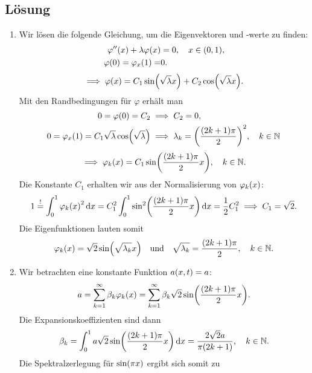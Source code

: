 \documentclass{exercise}
\begin{document}
    \subsection*{Lösung}
    \begin{enumerate}
        \item Wir lösen die folgende Gleichung, um die Eigenvektoren und -werte zu finden:
        \begin{align*}
            \varphi''\parentheses*{x} + \lambda\varphi\parentheses*{x} &= 0, \quad x \in \parentheses*{0, 1},\\
            \varphi\parentheses*{0} = \varphi_x\parentheses*{1} =& 0.
        \end{align*}
        \[
            \implies \varphi\parentheses*{x} = C_1 \sin\parentheses*{\sqrt{\lambda}x} + C_2 \cos\parentheses*{\sqrt{\lambda}x}.
        \]
        Mit den Randbedingungen für \(\varphi\) erhält man
        \begin{align*}
            0 = \varphi\parentheses*{0} = C_2 &\implies C_2 = 0,\\
            0 = \varphi_x\parentheses*{1} = C_1 \sqrt{\lambda}\cos\parentheses*{\sqrt{\lambda}} &\implies \lambda_k = \parentheses*{\frac{\parentheses*{2k + 1}\pi}{2}}^2, \quad k \in \N
        \end{align*}
        \[
            \implies \varphi_k\parentheses*{x} = C_1\sin\parentheses*{\frac{\parentheses*{2k + 1}\pi}{2}x}, \quad k \in \N.
        \]
        Die Konstante \(C_1\) erhalten wir aus der Normalisierung von \(\varphi_k\parentheses*{x}\):
        \[
            1 \stackrel{!}{=} \int_0^1 \varphi_k\parentheses*{x}^2 \d x = C_1^2 \int_0^1 \sin^2\parentheses*{\frac{\parentheses*{2k + 1}\pi}{2}x}\d x = \frac{1}{2}C_1^2 \implies C_1 = \sqrt{2}.
        \]
        Die Eigenfunktionen lauten somit
        \[
            \varphi_k\parentheses*{x} = \sqrt{2}\sin\parentheses*{\sqrt{\lambda_k}x} \quad \text{und} \quad \sqrt{\lambda_k} = \frac{\parentheses*{2k + 1}\pi}{2}, \quad k \in \N.
        \]
        \item Wir betrachten eine konstante Funktion \(a\parentheses*{x, t} = a\):
        \[
            a = \sum_{k = 1}^\infty \beta_k \varphi_k\parentheses*{x} = \sum_{k = 1}^\infty \beta_k \sqrt{2}\sin\parentheses*{\frac{\parentheses*{2k + 1}\pi}{2}x}.
        \]
        Die Expansionskoeffizienten sind dann
        \[
            \beta_k = \int_0^1 a\sqrt{2}\sin\parentheses*{\frac{\parentheses*{2k + 1}\pi}{2}x}\d x = \frac{2\sqrt{2}a}{\pi\parentheses*{2k + 1}}, \quad k \in \N.
        \]
        Die Spektralzerlegung für \(\sin\parentheses*{\pi x}\) ergibt sich somit zu

\end{enumerate}
\end{document}
